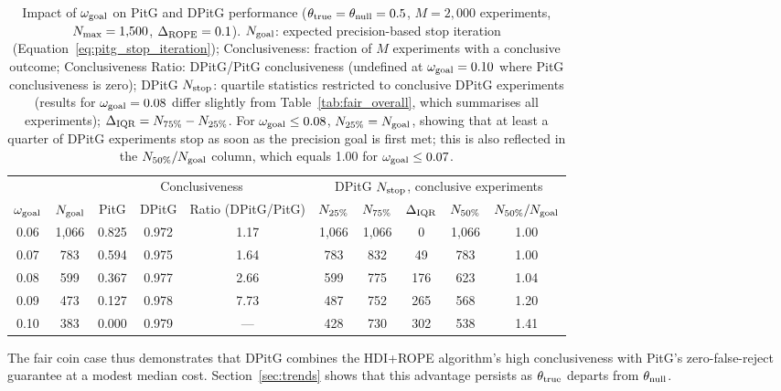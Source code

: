 \begin{table}[h!]
  \begin{center}
  \begin{tabular}{c|c|c|c|c|c|c|c|c|c}
    \hline
    & & \multicolumn{3}{c|}{Conclusiveness} & \multicolumn{5}{c}{DPitG $N_{\rm stop}$, conclusive experiments} \\
    $\omega_{\rm goal}$ & $N_{\rm goal}$ & PitG & DPitG & Ratio (DPitG/PitG) & $N_{\rm 25\%}$ & $N_{\rm 75\%}$ & $\Delta_{\rm IQR}$ & $N_{\rm 50\%}$ & $N_{\rm 50\%}/N_{\rm goal}$\\
    \hline
    0.06 & 1{,}066 & 0.825 & 0.972 & 1.17 & 1{,}066 & 1{,}066 &   0 & 1{,}066 & 1.00\\
    0.07 &   783   & 0.594 & 0.975 & 1.64 &   783   &   832   &  49 &   783   & 1.00\\
    0.08 &   599   & 0.367 & 0.977 & 2.66 &   599   &   775   & 176 &   623   & 1.04\\
    0.09 &   473   & 0.127 & 0.978 & 7.73 &   487   &   752   & 265 &   568   & 1.20\\
    0.10 &   383   & 0.000 & 0.979 & ---  &   428   &   730   & 302 &   538   & 1.41\\
    \hline
  \end{tabular}
  \caption{Impact of $\omega_{\rm goal}$ on PitG and DPitG performance
  ($\theta_{\rm true}=\theta_{\rm null}=0.5$, $M=2{,}000$ experiments,
  $N_{\rm max}=1{,}500$, $\Delta_{\rm ROPE}=0.1$).
  $N_{\rm goal}$: expected precision-based stop iteration (Equation~\ref{eq:pitg_stop_iteration});
  Conclusiveness: fraction of $M$ experiments with a conclusive outcome;
  Conclusiveness Ratio: DPitG/PitG conclusiveness (undefined at $\omega_{\rm goal}=0.10$
  where PitG conclusiveness is zero);
  DPitG $N_{\rm stop}$: quartile statistics restricted to conclusive DPitG experiments
  (results for $\omega_{\rm goal}=0.08$ differ slightly from Table~\ref{tab:fair_overall},
  which summarises all experiments);
  $\Delta_{\rm IQR} = N_{\rm 75\%} - N_{\rm 25\%}$.
  For $\omega_{\rm goal} \le 0.08$, $N_{\rm 25\%} = N_{\rm goal}$, showing that at least
  a quarter of DPitG experiments stop as soon as the precision goal is first met; this is
  also reflected in the $N_{\rm 50\%}/N_{\rm goal}$ column, which equals 1.00 for
  $\omega_{\rm goal} \le 0.07$.}
  \label{tab:goal_impact}
\end{center}
\end{table}

The fair coin case thus demonstrates that DPitG combines the HDI+ROPE algorithm's high
conclusiveness with PitG's zero-false-reject guarantee at a modest median cost.
Section~\ref{sec:trends} shows that this advantage persists as $\theta_{\rm true}$
departs from $\theta_{\rm null}$.

